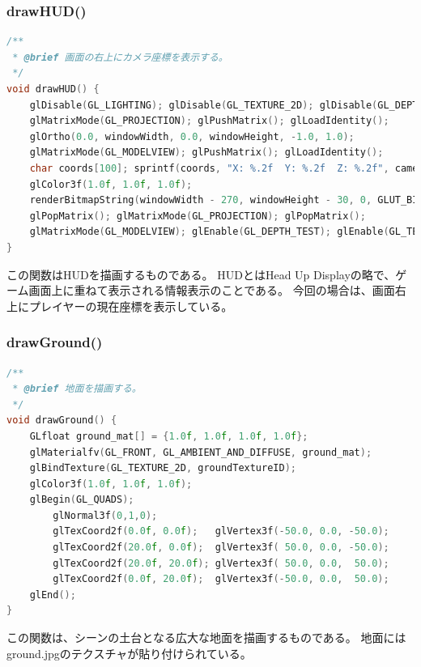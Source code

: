 \documentclass[uplatex,dvipdfmx,a4paper]{jsarticle}
\begin{document}
\hypertarget{func:drawHUD}{}\subsubsection{drawHUD()}\label{func:drawHUD}
\begin{lstlisting}[language=C++, caption={drawHUD() 関数}, label={lst:drawHUD_detail}]
/**
 * @brief 画面の右上にカメラ座標を表示する。
 */
void drawHUD() {
    glDisable(GL_LIGHTING); glDisable(GL_TEXTURE_2D); glDisable(GL_DEPTH_TEST);
    glMatrixMode(GL_PROJECTION); glPushMatrix(); glLoadIdentity(); 
    glOrtho(0.0, windowWidth, 0.0, windowHeight, -1.0, 1.0);
    glMatrixMode(GL_MODELVIEW); glPushMatrix(); glLoadIdentity();
    char coords[100]; sprintf(coords, "X: %.2f  Y: %.2f  Z: %.2f", cameraX, cameraY, cameraZ);
    glColor3f(1.0f, 1.0f, 1.0f);
    renderBitmapString(windowWidth - 270, windowHeight - 30, 0, GLUT_BITMAP_HELVETICA_18, coords);
    glPopMatrix(); glMatrixMode(GL_PROJECTION); glPopMatrix();
    glMatrixMode(GL_MODELVIEW); glEnable(GL_DEPTH_TEST); glEnable(GL_TEXTURE_2D); glEnable(GL_LIGHTING);
}
\end{lstlisting}
この関数はHUDを描画するものである。
HUDとはHead Up Displayの略で、ゲーム画面上に重ねて表示される情報表示のことである。
今回の場合は、画面右上にプレイヤーの現在座標を表示している。

\hypertarget{func:drawGround}{}\subsubsection{drawGround()}\label{func:drawGround}
\begin{lstlisting}[language=C++, caption={drawGround() 関数}, label={lst:drawGround_detail}]
/**
 * @brief 地面を描画する。
 */
void drawGround() {
    GLfloat ground_mat[] = {1.0f, 1.0f, 1.0f, 1.0f};
    glMaterialfv(GL_FRONT, GL_AMBIENT_AND_DIFFUSE, ground_mat);
    glBindTexture(GL_TEXTURE_2D, groundTextureID);
    glColor3f(1.0f, 1.0f, 1.0f);
    glBegin(GL_QUADS);
        glNormal3f(0,1,0);
        glTexCoord2f(0.0f, 0.0f);   glVertex3f(-50.0, 0.0, -50.0);
        glTexCoord2f(20.0f, 0.0f);  glVertex3f( 50.0, 0.0, -50.0);
        glTexCoord2f(20.0f, 20.0f); glVertex3f( 50.0, 0.0,  50.0);
        glTexCoord2f(0.0f, 20.0f);  glVertex3f(-50.0, 0.0,  50.0);
    glEnd();
}
\end{lstlisting}
この関数は、シーンの土台となる広大な地面を描画するものである。
地面にはground.jpgのテクスチャが貼り付けられている。
\end{document}

